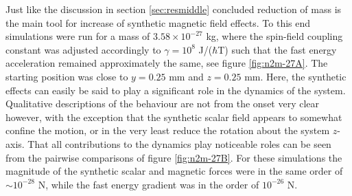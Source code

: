 \documentclass[main.tex]{subfiles}
\begin{document}
Just like the discussion in section \ref{sec:resmiddle} concluded reduction of mass is the
main tool for increase of synthetic magnetic field effects. To this end simulations were
run for a mass of \(3.58\times 10^{-27}\) kg, where the spin-field coupling constant was
adjusted accordingly to \(\gamma = 10^{8}\) J/(\(\hbar{}\)T) such that the fast energy
acceleration remained approximately the same, see figure \ref{fig:n2m-27A}. The starting
position was close to \(y= 0.25\) mm and \(z = 0.25\) mm. Here, the
synthetic effects can easily be said to play a significant role in the
dynamics of the system. Qualitative descriptions of the behaviour are not from the onset
very clear however, with the exception that the synthetic scalar field appears to somewhat confine the
motion, or in the very least reduce the rotation about the system \(z\)-axis. That all
contributions to the dynamics play noticeable roles can be seen from the pairwise
comparisons of figure \ref{fig:n2m-27B}. For these simulations the magnitude of the
synthetic scalar and magnetic forces were in the same order of \(\sim 10^{-28}\) N, while
the fast energy gradient was in the order of \(10^{-26}\) N.
\end{document}

